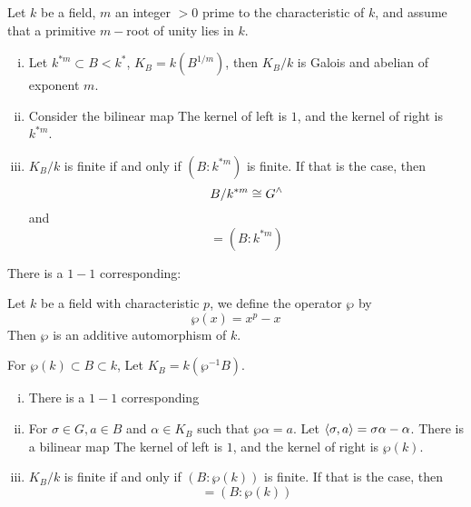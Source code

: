   \begin{thm}
    Let $k$ be a field, $m$ an integer $>0$ prime to the characteristic of $k$, and assume that a primitive $m-$root of unity lies in $k$.
    \begin{enumerate}[(i)]
      \item Let $k^{\ast m}\subset B< k^{\ast}$, $K_B=k(B^{1/m})$, then $K_B/k$ is Galois and abelian of exponent $m$.
      \item Consider the bilinear map
                 The kernel of left is $1$, and the kernel of right is $k^{\ast m}$.
      \item $K_B/k$ is finite if and only if $(B:k^{\ast m})$ is finite. If that is the case, then
                 \begin{equation*}
                   B/k^{\ast m}\cong {G}^{\wedge}
                 \end{equation*}
                 and
                 \begin{equation*}
                   [K_B:k]=(B:k^{\ast m})
                 \end{equation*}
    \end{enumerate}
  \end{thm}

  \begin{thm}
    There is a $1-1$ corresponding:
  \end{thm}

  \begin{thm}
      Let $k$ be a field with characteristic $p$, we define the operator $\wp$ by
      \begin{equation*}
        \wp(x)=x^p-x
      \end{equation*}
      Then $\wp$ is an additive automorphism of $k$.

      For $\wp(k)\subset B\subset k$, Let $K_B=k(\wp^{-1}B)$.
    \begin{enumerate}[(i)]
      \item There is a $1-1$ corresponding
      \item For $\sigma\in G, a\in B$ and $\alpha\in K_B$ such that $\wp\alpha=a$. Let $\langle\sigma,a\rangle=\sigma\alpha-\alpha$.
                 There is a bilinear map
                 The kernel of left is $1$, and the kernel of right is $\wp(k)$.
      \item $K_B/k$ is finite if and only if $(B:\wp(k))$ is finite. If that is the case, then
                 \begin{equation*}
                   [K_B:k]=(B:\wp(k))
                 \end{equation*}
    \end{enumerate}
  \end{thm}

